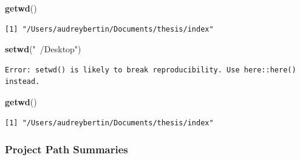 \documentclass[12pt,twoside]{reedthesis}
\newenvironment{Shaded}{\begin{snugshade}}{\end{snugshade}}
\newcommand{\KeywordTok}[1]{\textcolor[rgb]{0.13,0.29,0.53}{\textbf{#1}}}
\newcommand{\NormalTok}[1]{#1}
\newcommand{\StringTok}[1]{\textcolor[rgb]{0.31,0.60,0.02}{#1}}
\begin{document}
\begin{Shaded}
\begin{Highlighting}[]
\KeywordTok{getwd}\NormalTok{()}
\end{Highlighting}
\end{Shaded}
\begin{verbatim}
[1] "/Users/audreybertin/Documents/thesis/index"
\end{verbatim}
\begin{Shaded}
\begin{Highlighting}[]
\KeywordTok{setwd}\NormalTok{(}\StringTok{"~/Desktop"}\NormalTok{)}
\end{Highlighting}
\end{Shaded}
\begin{verbatim}
Error: setwd() is likely to break reproducibility. Use here::here() instead.
\end{verbatim}
\begin{Shaded}
\begin{Highlighting}[]
\KeywordTok{getwd}\NormalTok{()}
\end{Highlighting}
\end{Shaded}
\begin{verbatim}
[1] "/Users/audreybertin/Documents/thesis/index"
\end{verbatim}
\hypertarget{project-path-summaries}{%
\subsubsection{Project Path Summaries}\label{project-path-summaries}}
\end{document}
